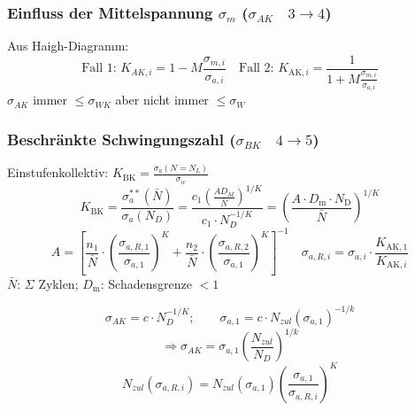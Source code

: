         \subsubsection{Einfluss der Mittelspannung $\sigma_m$ ($\sigma_{AK}\quad3\rightarrow4$)}
            Aus Haigh-Diagramm:
            \[\textrm{Fall 1: }K_{AK,i}=1-M\frac{\sigma_{m,i}}{\sigma_{a,i}}\quad\textrm{Fall 2: }K_{\textrm{AK},i}=\frac{1}{1+M\frac{\sigma_{m,i}}{\sigma_{a,i}}}\]
            $\sigma_{AK}$ immer $\leq\sigma_{WK}$ aber nicht immer $\leq\sigma_W$
        \subsubsection{Beschränkte Schwingungszahl ($\sigma_{BK}\quad4\rightarrow5$)}
            Einstufenkollektiv: $\displaystyle K_{\textrm{BK}}= \frac{\sigma_{a}(N=N_L)}{\sigma_w}$\\
            \[ K_{\textrm{BK}}=\frac{\sigma_{a}^{**}(\bar{N})}{\sigma_{a}(N_{D})}=\frac{c_1\left(\frac{AD_M}{\bar{N}}\right)^{1/K}}{c_1\cdot N_D^{-1/K}}=\left(\frac{A\cdot D_{\textrm{m}}\cdot N_{\textrm{D}}}{\bar{N}}\right)^{1/K}\]
            \[A = \left[\frac{n_1}{\bar{N}}\cdot\left(\frac{\sigma_{a,R,1}}{\sigma_{a,1}}\right)^{K}+\frac{n_2}{\bar{N}}\cdot\left(\frac{\sigma_{a,R,2}}{\sigma_{a,1}}\right)^{K}\right]^{-1}\quad \sigma_{a,R,i}=\sigma_{a,i}\cdot\frac{K_{\textrm{AK},1}}{K_{\textrm{AK},i}}\]
            $\bar{N}$: $\Sigma$ Zyklen; \qquad $D_{\textrm{m}}$: Schadensgrenze $<1$
            
            \[\sigma_{AK}=c\cdot N_D^{-1/K}; \qquad \sigma_{a,1}= c\cdot N_{zul}(\sigma_{a,1})^{-1/k}\]
            \[\Rightarrow \sigma_{AK}= \sigma_{a,1}\left(\frac{N_{zul}}{N_D}\right)^{1/k}\]
            \[N_{zul}(\sigma_{a,R,i})=N_{zul}(\sigma_{a,1})\left(\frac{\sigma_{a,1}}{\sigma_{a,R,i}}\right)^K\]

\vfill\null\columnbreak
